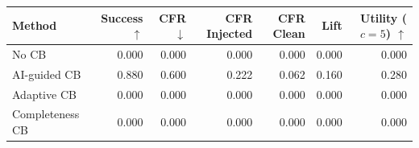 \begin{tabular}{lrrrrrr}
\toprule
Method & Success $\uparrow$ & CFR $\downarrow$ & CFR Injected & CFR Clean & Lift & Utility ($c=5$) $\uparrow$ \\
\midrule
No CB & 0.000 & 0.000 & 0.000 & 0.000 & 0.000 & 0.000 \\
AI-guided CB & 0.880 & 0.600 & 0.222 & 0.062 & 0.160 & 0.280 \\
Adaptive CB & 0.000 & 0.000 & 0.000 & 0.000 & 0.000 & 0.000 \\
Completeness CB & 0.000 & 0.000 & 0.000 & 0.000 & 0.000 & 0.000 \\
\bottomrule
\end{tabular}
